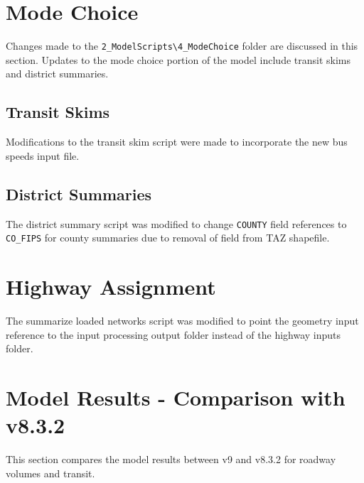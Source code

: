 \documentclass[
  letterpaper,
  DIV=11,
  numbers=noendperiod]{scrreprt}
\begin{document}

\hypertarget{mode-choice-1}{%
\chapter{Mode Choice}\label{mode-choice-1}}

Changes made to the
\texttt{2\_ModelScripts\textbackslash{}4\_ModeChoice} folder are
discussed in this section. Updates to the mode choice portion of the
model include transit skims and district summaries.

\hypertarget{transit-skims}{%
\section{Transit Skims}\label{transit-skims}}

Modifications to the transit skim script were made to incorporate the
new bus speeds input file.

\hypertarget{district-summaries}{%
\section{District Summaries}\label{district-summaries}}

The district summary script was modified to change \texttt{COUNTY} field
references to \texttt{CO\_FIPS} for county summaries due to removal of
field from TAZ shapefile.


\hypertarget{highway-assignment}{%
\chapter{Highway Assignment}\label{highway-assignment}}

The summarize loaded networks script was modified to point the geometry
input reference to the input processing output folder instead of the
highway inputs folder.


\hypertarget{model-results---comparison-with-v8.3.2}{%
\chapter{Model Results - Comparison with
v8.3.2}\label{model-results---comparison-with-v8.3.2}}

This section compares the model results between v9 and v8.3.2 for
roadway volumes and transit.
\end{document}
